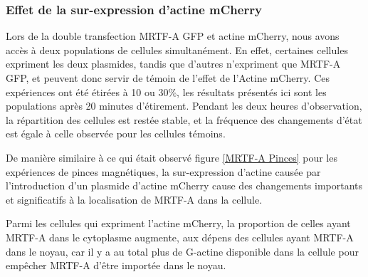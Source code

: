 \subsubsection{Effet de la sur-expression d'actine mCherry}

Lors de la double transfection MRTF-A GFP et actine mCherry, nous avons accès à deux populations de cellules simultanément. En effet, certaines cellules expriment les deux plasmides, tandis que d'autres n'expriment que MRTF-A GFP, et peuvent donc servir de témoin de l'effet de l'Actine mCherry. 
Ces expériences ont été étirées à 10 ou 30\%, les résultats présentés ici sont les populations après 20 minutes d'étirement. Pendant les deux heures d'observation, la répartition des cellules est restée stable, et la fréquence des changements d'état est égale à celle observée pour les cellules témoins. 

De manière similaire à ce qui était observé figure \ref{MRTF-A Pinces} pour les expériences de pinces magnétiques, la sur-expression d'actine causée par l'introduction d'un plasmide d'actine mCherry cause des changements importants et significatifs à la localisation de MRTF-A dans la cellule. 

Parmi les cellules qui expriment l'actine mCherry, la proportion de celles ayant MRTF-A dans le cytoplasme augmente, aux dépens des cellules ayant MRTF-A dans le noyau, car il y a au total plus de G-actine disponible dans la cellule pour empêcher MRTF-A d'être importée dans le noyau. 

